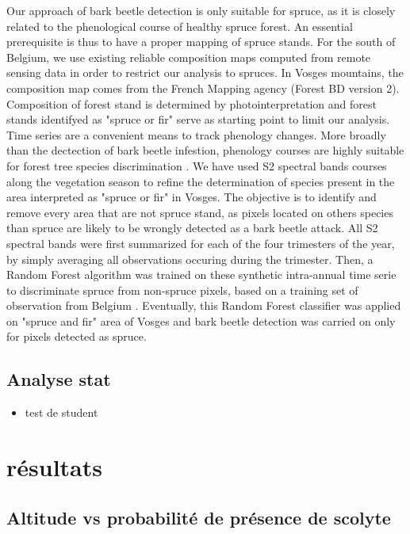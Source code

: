 \documentclass[3p,times]{elsarticle}
\begin{document}
Our approach of bark beetle detection is only suitable for spruce, as it is closely related to the phenological course of healthy spruce forest.
An essential prerequisite is thus to have a proper mapping of spruce stands.
For the south of Belgium, we use existing reliable composition maps \citep{bolyn_forest_2018} computed from remote sensing data in order to restrict our analysis to spruces.
In Vosges mountains, the composition map comes from the French Mapping agency (Forest BD version 2). 
Composition of forest stand is determined by photointerpretation and forest stands identifyed as "spruce or fir" serve as starting point to limit our analysis.
Time series are a convenient means to track phenology changes. 
More broadly than the dectection of bark beetle infestion, phenology courses are highly suitable for forest tree species discrimination \citep{lisein_discrimination_2015,grabska_forest_2019,ma_tree_2021}.
We have used S2 spectral bands courses along the vegetation season to refine the determination of species present in the area interpreted as "spruce or fir" in Vosges.
The objective is to identify and remove every area that are not spruce stand, as pixels located on others species than spruce are likely to be wrongly detected as a bark beetle attack.
All S2 spectral bands were first summarized for each of the four trimesters of the year, by simply averaging all observations occuring during the trimester.
Then, a Random Forest algorithm was trained on these synthetic intra-annual time serie to discriminate spruce from non-spruce pixels, based on a training set of observation from Belgium \citep{bolyn_forest_2018}.
Eventually, this Random Forest classifier was applied on "spruce and fir" area of Vosges and bark beetle detection was carried on only for pixels detected as spruce. 






\subsection{Analyse stat}
\begin{itemize}
	\item test de student 
\end{itemize}

\section{résultats}

\subsection{ Altitude vs probabilité de présence de scolyte}
\end{document}
